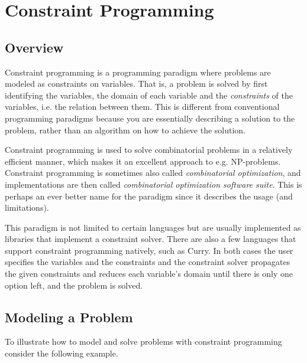 \section{Constraint Programming}

\subsection{Overview}

Constraint programming is a programming paradigm where problems are modeled as constraints
on variables. That is, a problem is solved by first identifying the variables, the domain
of each variable and the \textit{constraints} of the variables, i.e. the relation between them.
This is different from conventional programming paradigms because you are essentially
describing a solution to the problem, rather than an algorithm on how to achieve the solution.

Constraint programming is used to solve combinatorial problems in a relatively efficient
manner, which makes it an excellent approach to e.g. NP-problems. Constraint programming
is sometimes also called \textit{combinatorial optimization}, and implementations are then
called \textit{combinatorial optimization software suite}. This is perhaps an ever better
name for the paradigm since it describes the usage (and limitations).

This paradigm is not limited to certain languages but are usually implemented as libraries
that implement a constraint solver. There are also a few languages that support constraint
programming natively, such as Curry.
In both cases the user specifies the variables and
the constraints and the constraint solver propagates the given constraints and reduces each
variable's domain until there is only one option left, and the problem is solved.

\subsection{Modeling a Problem}

To illustrate how to model and solve problems with constraint programming consider the
following example.

